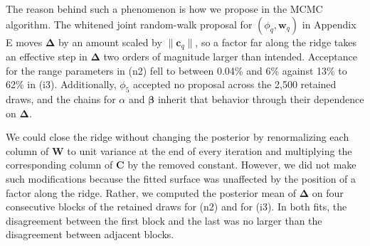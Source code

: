 \documentclass{article}
\begin{document}
The reason behind such a phenomenon is how we propose in the MCMC algorithm. The whitened joint random-walk proposal for $(\phi_q,\mathbf{w}_q)$ in Appendix E moves $\boldsymbol\Delta$ by an amount scaled by $\|\mathbf{c}_q\|$, so a factor far along the ridge takes an effective step in $\boldsymbol\Delta$ two orders of magnitude larger than intended. Acceptance for the range parameters in (n2) fell to between 0.04\% and 6\% against 13\% to 62\% in (i3). Additionally, $\phi_5$ accepted no proposal across the 2,500 retained draws, and the chains for $\alpha$ and $\boldsymbol\beta$ inherit that behavior through their dependence on $\boldsymbol\Delta$.
 
We could close the ridge without changing the posterior by renormalizing each column of $\mathbf{W}$ to unit variance at the end of every iteration and multiplying the corresponding column of $\mathbf{C}$ by the removed constant. However, we did not make such modifications because the fitted surface was unaffected by the position of a factor along the ridge. Rather, we computed the posterior mean of $\boldsymbol\Delta$ on four consecutive blocks of the retained draws for (n2) and for (i3). In both fits, the disagreement between the first block and the last was no larger than the disagreement between adjacent blocks.


\end{document}
